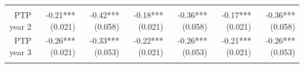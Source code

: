 \documentclass[]{article}
\begin{document}
\begin{longtable}[c]{@{}rrrrrrr@{}}
\begin{minipage}[t]{0.11\columnwidth}
\strut\end{minipage}\tabularnewline
\begin{minipage}[t]{0.12\columnwidth}\raggedleft\strut
PTP year 2
\strut\end{minipage} &
\begin{minipage}[t]{0.11\columnwidth}\raggedleft\strut
-0.21*** (0.021)
\strut\end{minipage} &
\begin{minipage}[t]{0.12\columnwidth}\raggedleft\strut
-0.42*** (0.058)
\strut\end{minipage} &
\begin{minipage}[t]{0.11\columnwidth}\raggedleft\strut
-0.18*** (0.021)
\strut\end{minipage} &
\begin{minipage}[t]{0.12\columnwidth}\raggedleft\strut
-0.36*** (0.058)
\strut\end{minipage} &
\begin{minipage}[t]{0.11\columnwidth}\raggedleft\strut
-0.17*** (0.021)
\strut\end{minipage} &
\begin{minipage}[t]{0.11\columnwidth}\raggedleft\strut
-0.36*** (0.058)
\strut\end{minipage}\tabularnewline
\begin{minipage}[t]{0.12\columnwidth}\raggedleft\strut
PTP year 3
\strut\end{minipage} &
\begin{minipage}[t]{0.11\columnwidth}\raggedleft\strut
-0.26*** (0.021)
\strut\end{minipage} &
\begin{minipage}[t]{0.12\columnwidth}\raggedleft\strut
-0.33*** (0.053)
\strut\end{minipage} &
\begin{minipage}[t]{0.11\columnwidth}\raggedleft\strut
-0.22*** (0.021)
\strut\end{minipage} &
\begin{minipage}[t]{0.12\columnwidth}\raggedleft\strut
-0.26*** (0.053)
\strut\end{minipage} &
\begin{minipage}[t]{0.11\columnwidth}\raggedleft\strut
-0.21*** (0.021)
\strut\end{minipage} &
\begin{minipage}[t]{0.11\columnwidth}\raggedleft\strut
-0.26*** (0.053)
\strut\end{minipage}\tabularnewline
\begin{minipage}[t]{0.12\columnwidth}\raggedleft\strut

\end{minipage}
\end{longtable}
\end{document}
